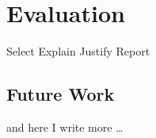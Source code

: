 \chapter{Evaluation}

Select
Explain
Justify
Report

\section{Future Work}
and here I write more \dots


